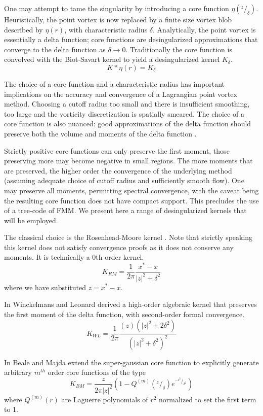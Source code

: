 \documentclass[letterpaper,12pt]{report}
\newcommand{\be}{\begin{equation}}
\newcommand{\ben}[1]{\begin{equation}\label{#1}}
\newcommand{\ee}{\end{equation}}
\begin{document}
One may attempt to tame the singularity  by introducing a core function $\eta(^z/_{\delta})$. Heuristically, the point vortex is now replaced by a finite size vortex blob described by $\eta(r)$, with characteristic radius $\delta$. Analytically, the point vortex is essentially a delta function; core functions are desingularized approximations that converge to the delta function as $\delta \rightarrow 0$. Traditionally the core function is convolved with the Biot-Savart kernel to yield a desingularized kernel $K_{\delta}$.
\be K*\eta(r) = K_{\delta} \ee

The choice of a core function and a characteristic radius has important implications on the accuracy and convergence of a Lagrangian point vortex method. Choosing a cutoff radius too small and there is insufficient smoothing, too large and the vorticity discretization is spatially smeared. The choice of a core function is also nuanced: good approximations of the delta function should preserve both the volume and moments of the delta function \cite{BealeMajda}.

Strictly positive core functions can only preserve the first moment, those preserving more may become negative in small regions. The more moments that are preserved, the higher order the convergence of the underlying method (assuming adequate choice of cutoff radius and sufficiently smooth flow). One may preserve all moments, permitting spectral convergence, with the caveat being the resulting core function does not have compact support. This precludes the use of a tree-code of FMM.
We present here a range of desingularized kernels that will be employed.

The classical choice is the Rosenhead-Moore kernel \cite{Rosenhead1930,Moore1972}. Note that strictly speaking this kernel does not satisfy convergence proofs as it does not conserve any moments. It is technically a 0th order kernel.
\ben{RMkern} K_{RM} = \frac{1}{2 \pi} \frac{x^*-x}{|z|^2+\delta^2} \ee
where we have substituted $z=x^*-x$.

In \cite{WL} Winckelmans and Leonard derived a high-order algebraic kernel that preserves the first moment of the delta function, with second-order formal convergence.
\ben{WLkern} K_{WL}=\frac{1}{2 \pi} \frac{(z)(|z|^2+2\delta^2)}{(|z|^2+\delta^2)^2} \ee

In \cite{BealeMajda} Beale and Majda extend the super-gaussian core function to explicitly generate arbitrary $m^{th}$ order core functions of the type
\ben{SGkern} K_{BM}= \frac{z}{2 \pi |z|^2} (1-Q^{(m)}(^z\!/_{\delta})e^{^{-z^2}\!/_{\delta^2}} )\ee
where $Q^{(m)}(r)$ are Laguerre polynomials of $r^2$ normalized to set the first term to 1.
\end{document}
